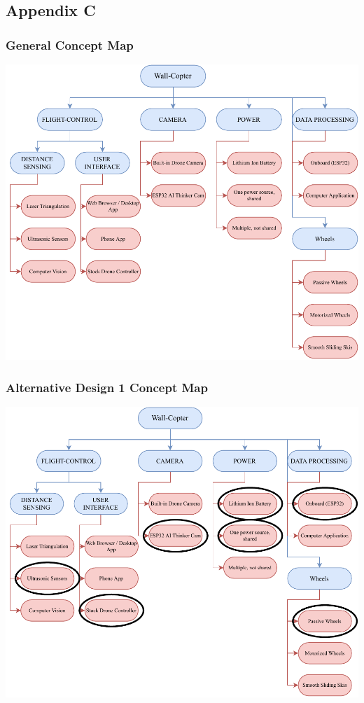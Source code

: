 \documentclass[12pt]{article}
\begin{document}
        \newpage
        \subsection{Appendix C}
            \subsubsection{General Concept Map}
                \centerline{\includegraphics{./resources/assignment3-general_concept_map.drawio.pdf}}
            
            \subsubsection{Alternative Design 1 Concept Map}
                \centerline{\includegraphics{./resources/assignment3-Design1.concept_map.drawio.pdf}}
            
\end{document}
